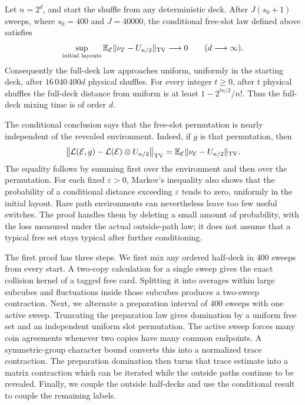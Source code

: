 \begin{theorem}\label{thm:methods}
Let $n=2^d$, and start the shuffle from any deterministic deck.
After $J(s_0+1)$ sweeps, where $s_0=400$ and $J=40000$, the conditional free-slot law defined above satisfies
\[
 \sup_{\text{initial layouts}}\mathbb E_{\mathcal E}
       \|\nu_{\mathcal E}-U_{n/2}\|_{\mathrm{TV}}\longrightarrow0
       \qquad(d\longrightarrow\infty).
\]
Consequently the full-deck law approaches uniform, uniformly in the starting deck, after $16\,040\,400d$ physical shuffles. For every integer $t\ge0$, after $t$ physical shuffles the full-deck distance from uniform is at least
$1-2^{tn/2}/n!$. Thus the full-deck mixing time is of order $d$.
\end{theorem}

The conditional conclusion says that the free-slot permutation is nearly independent of the revealed environment. Indeed, if $g$ is that permutation, then
\[
 \left\|\mathcal L(\mathcal E,g)
       -\mathcal L(\mathcal E)\otimes U_{n/2}\right\|_{\mathrm{TV}}
 =\mathbb E_{\mathcal E}\|\nu_{\mathcal E}-U_{n/2}\|_{\mathrm{TV}}.
\]
The equality follows by summing first over the environment and then over the permutation. For each fixed $\varepsilon>0$, Markov's inequality also shows that the probability of a conditional distance exceeding $\varepsilon$ tends to zero, uniformly in the initial layout. Rare path environments can nevertheless leave too few useful switches. The proof handles them by deleting a small amount of probability, with the loss measured under the actual outside-path law; it does not assume that a typical free set stays typical after further conditioning.

The first proof has three steps. We first mix any ordered half-deck in $400$ sweeps from every start. A two-copy calculation for a single sweep gives the exact collision kernel of a tagged free card. Splitting it into averages within large subcubes and fluctuations inside those subcubes produces a two-sweep contraction. Next, we alternate a preparation interval of $400$ sweeps with one active sweep. Truncating the preparation law gives domination by a uniform free set and an independent uniform slot permutation. The active sweep forces many coin agreements whenever two copies have many common endpoints. A symmetric-group character bound converts this into a normalized trace contraction. The preparation domination then turns that trace estimate into a matrix contraction which can be iterated while the outside paths continue to be revealed. Finally, we couple the outside half-decks and use the conditional result to couple the remaining labels.


